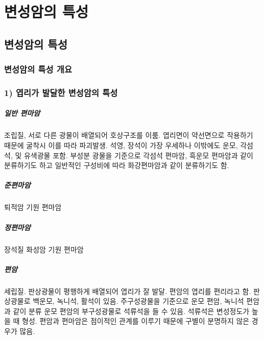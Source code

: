 \documentclass[12pt, a4paper, twoside]{book}
\begin{document}
	\clearpage
	\chapter{변성암의 특성}
	\minitoc				%


	\clearpage
	\section{변성암의 특성}
	
		\subsection{변성암의 특성 개요}



		\subsection{1) 엽리가 발달한 변성암의 특성}


			\paragraph{일반 편마암}	조립질, 서로 다른 광물이 배열되어 호상구조를 이룸. 엽리면이 약선면으로 작용하기 때문에 굴착시 이를 따라 파괴발생. 
											석영, 장석이 가장 우세하나 이밖에도 운모, 각섬석, 및 유색광물 포함. 
											부성분 광물을 기준으로 각섬석 편마암, 흑운모 편마암과 같이 분류하기도 하고 일반적인 구성비에 따라 화강편마암과 같이 분류하기도 함. 
			\paragraph{준편마암} 	퇴적암 기원 편마암 
			\paragraph{정편마암} 	장석질 화성암 기원 편마암 
			\paragraph{편암}	세립질. 판상광물이 평행하게 배열되어 엽리가 잘 발달. 편암의 엽리를 편리라고 함. 
							판상광물로 백운모, 녹니석, 활석이 있음. 
							주구성광물을 기준으로 운모 편암, 녹니석 편암과 같이 분류 운모 편암의 부구성광물로 석류석을 들 수 있음. 
							석류석은 변성정도가 높을 때 형성. 편암과 편마암은 점이적인 관계를 이루기 때문에 구별이 분명하지 않은 경우가 많음.  
\end{document}
